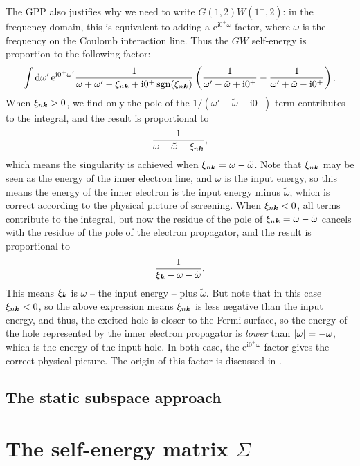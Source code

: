 \documentclass[hyperref, a4paper]{report}
\DeclareMathOperator{\sgn}{sgn}
\newcommand*{\ii}{\mathrm{i}}
\newcommand*{\ee}{\mathrm{e}}
\begin{document}
The GPP also justifies why we need to write $G(1, 2) W(1^+, 2)$: 
in the frequency domain, 
this is equivalent to adding a $\ee^{\ii 0^+ \omega}$ factor,
where $\omega$ is the frequency on the Coulomb interaction line.
Thus the $GW$ self-energy is proportion to the following factor:
\[
    \int \dd{\omega'} \ee^{\ii 0^+ \omega'} 
    \frac{1}{\omega + \omega' - \xi_{n \vb*{k}} + \ii 0^+ \sgn(\xi_{n \vb*{k}})}
    \left(
        \frac{1}{\omega' - \tilde{\omega} + \ii 0^+}
        - \frac{1}{\omega' + \tilde{\omega} - \ii 0^+}
    \right).
\]
When $\xi_{n \vb*{k}} > 0$, we find only the pole of the $1 / (\omega' + \tilde{\omega} - \ii 0^+)$ term  
contributes to the integral, 
and the result is proportional to 
\[
    \frac{1}{\omega - \tilde{\omega} - \xi_{n \vb*{k}}},
\]
which means the singularity is achieved when 
$\xi_{n \vb*{k}} = \omega - \tilde{\omega}$.
Note that $\xi_{n \vb*{k}}$ may be seen as the energy of the inner electron line, 
and $\omega$ is the input energy, 
so this means the energy of the inner electron 
is the input energy minus $\tilde{\omega}$,
which is correct according to the physical picture of screening.
When $\xi_{n \vb*{k}} < 0$, 
all terms contribute to the integral, 
but now the residue of the pole of $\xi_{n \vb*{k}} = \omega - \tilde{\omega}$ 
cancels with the residue of the pole of the electron propagator,
and the result is proportional to 
\[
    \frac{1}{\xi_{\vb*{k}} - \omega - \tilde{\omega}}.
\]
This means $\xi_{\vb*{k}}$ is $\omega$ -- the input energy -- plus $\tilde{\omega}$.
But note that in this case $\xi_{n \vb*{k}} < 0$,
so the above expression means $\xi_{n \vb*{k}}$ is less negative than the input energy,
and thus, the excited hole is closer to the Fermi surface, 
so the energy of the hole represented by the inner electron propagator 
is \emph{lower} than $\abs{\omega} = - \omega$,
which is the energy of the input hole. 
In both case, the $\ee^{\ii 0^+ \omega}$ factor 
gives the correct physical picture. 
The origin of this factor is discussed in .

\subsection{The static subspace approach}

\section{The self-energy matrix $\Sigma$}
\end{document}
